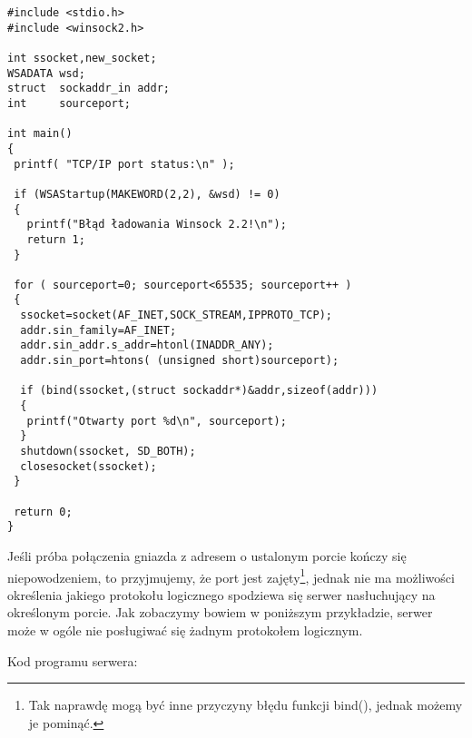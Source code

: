\begin{scriptsize}
\begin{verbatim}
#include <stdio.h>
#include <winsock2.h>

int ssocket,new_socket;
WSADATA wsd;
struct  sockaddr_in addr;
int     sourceport;

int main()
{
 printf( "TCP/IP port status:\n" );

 if (WSAStartup(MAKEWORD(2,2), &wsd) != 0)
 {
   printf("Błąd ładowania Winsock 2.2!\n");
   return 1;
 }

 for ( sourceport=0; sourceport<65535; sourceport++ )
 {
  ssocket=socket(AF_INET,SOCK_STREAM,IPPROTO_TCP); 
  addr.sin_family=AF_INET; 
  addr.sin_addr.s_addr=htonl(INADDR_ANY); 
  addr.sin_port=htons( (unsigned short)sourceport); 
  
  if (bind(ssocket,(struct sockaddr*)&addr,sizeof(addr)))
  {
   printf("Otwarty port %d\n", sourceport);
  } 
  shutdown(ssocket, SD_BOTH); 
  closesocket(ssocket);
 }

 return 0;
}
\end{verbatim}
\end{scriptsize}

Jeśli próba połączenia gniazda z adresem o ustalonym porcie kończy się niepowodzeniem, to 
przyjmujemy, że port jest zajęty\footnote{Tak naprawdę mogą być inne przyczyny błędu
funkcji bind(), jednak możemy je pominąć.}, jednak nie ma możliwości określenia jakiego
protokołu logicznego spodziewa się serwer nasłuchujący na określonym porcie. Jak zobaczymy
bowiem w poniższym przykładzie, serwer może w ogóle nie posługiwać się żadnym protokołem logicznym.

Kod programu serwera: 

